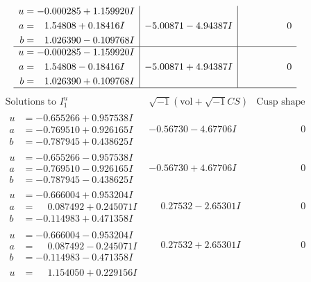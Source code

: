 \documentclass[1p]{elsarticle_modified}
\theoremstyle{definition}
\newcommand{\I}{\sqrt{-1}}
\begin{document}
$$\begin{array}{c|c|c}
\begin{aligned}
u &= -0.000285 + 1.159920 I \\
a &= \phantom{-}1.54808 + 0.18416 I \\
b &= \phantom{-}1.026390 - 0.109768 I\end{aligned}
 & -5.00871 - 4.94387 I & \phantom{-0.000000 } 0 \\ \hline\begin{aligned}
u &= -0.000285 - 1.159920 I \\
a &= \phantom{-}1.54808 - 0.18416 I \\
b &= \phantom{-}1.026390 + 0.109768 I\end{aligned}
 & -5.00871 + 4.94387 I & \phantom{-0.000000 } 0\\
 \hline 
 \end{array}$$\newpage$$\begin{array}{c|c|c}  
\text{Solutions to }I^u_{1}& \I (\text{vol} + \sqrt{-1}CS) & \text{Cusp shape}\\
 \hline 
\begin{aligned}
u &= -0.655266 + 0.957538 I \\
a &= -0.769510 + 0.926165 I \\
b &= -0.787945 + 0.438625 I\end{aligned}
 & -0.56730 - 4.67706 I & \phantom{-0.000000 } 0 \\ \hline\begin{aligned}
u &= -0.655266 - 0.957538 I \\
a &= -0.769510 - 0.926165 I \\
b &= -0.787945 - 0.438625 I\end{aligned}
 & -0.56730 + 4.67706 I & \phantom{-0.000000 } 0 \\ \hline\begin{aligned}
u &= -0.666004 + 0.953204 I \\
a &= \phantom{-}0.087492 + 0.245071 I \\
b &= -0.114983 + 0.471358 I\end{aligned}
 & \phantom{-}0.27532 - 2.65301 I & \phantom{-0.000000 } 0 \\ \hline\begin{aligned}
u &= -0.666004 - 0.953204 I \\
a &= \phantom{-}0.087492 - 0.245071 I \\
b &= -0.114983 - 0.471358 I\end{aligned}
 & \phantom{-}0.27532 + 2.65301 I & \phantom{-0.000000 } 0 \\ \hline\begin{aligned}
u &= \phantom{-}1.154050 + 0.229156 I \\

\end{aligned}
\end{array}$$
\end{document}
